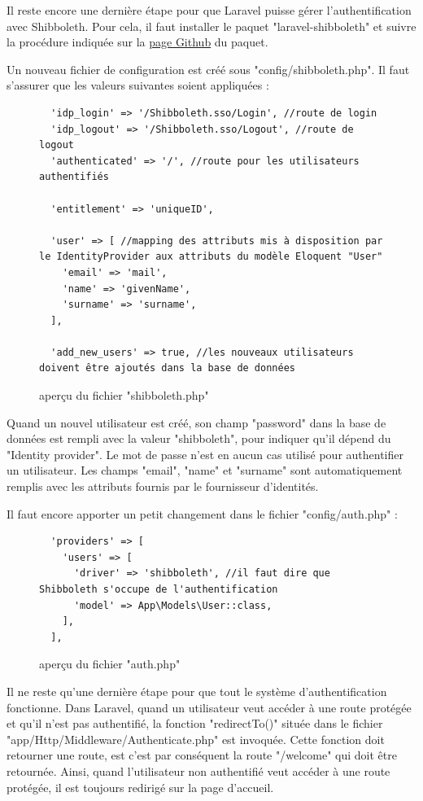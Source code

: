 \documentclass[
    iai, %
    eai, %
]{heig-tb}
\begin{document}
Il reste encore une dernière étape pour que Laravel puisse gérer l'authentification avec Shibboleth. Pour cela, il faut installer le paquet "laravel-shibboleth" et suivre la procédure indiquée sur la \href{https://github.com/uabookstores/laravel-shibboleth}{page Github} du paquet.

Un nouveau fichier de configuration est créé sous "config/shibboleth.php". Il faut s'assurer que les valeurs suivantes soient appliquées :

\begin{figure}[h]
  \begin{verbatim}
  'idp_login' => '/Shibboleth.sso/Login', //route de login
  'idp_logout' => '/Shibboleth.sso/Logout', //route de logout
  'authenticated' => '/', //route pour les utilisateurs authentifiés

  'entitlement' => 'uniqueID',

  'user' => [ //mapping des attributs mis à disposition par le IdentityProvider aux attributs du modèle Eloquent "User"
    'email' => 'mail',
    'name' => 'givenName',
    'surname' => 'surname',
  ],

  'add_new_users' => true, //les nouveaux utilisateurs doivent être ajoutés dans la base de données
  \end{verbatim}
  \caption{aperçu du fichier "shibboleth.php"}
\end{figure}

Quand un nouvel utilisateur est créé, son champ "password" dans la base de données est rempli avec la valeur "shibboleth", pour indiquer qu'il dépend du "Identity provider". Le mot de passe n'est en aucun cas utilisé pour authentifier un utilisateur. Les champs "email", "name" et "surname" sont automatiquement remplis avec les attributs fournis par le fournisseur d'identités.

\newpage
Il faut encore apporter un petit changement dans le fichier "config/auth.php" :

\begin{figure}[h]
  \begin{verbatim}
  'providers' => [
    'users' => [
      'driver' => 'shibboleth', //il faut dire que Shibboleth s'occupe de l'authentification
      'model' => App\Models\User::class,
    ],
  ],
  \end{verbatim}
  \caption{aperçu du fichier "auth.php"}
\end{figure}

Il ne reste qu'une dernière étape pour que tout le système d'authentification fonctionne. Dans Laravel, quand un utilisateur veut accéder à une route protégée et qu'il n'est pas authentifié, la fonction "redirectTo()" située dans le fichier "app/Http/Middleware/Authenticate.php" est invoquée. Cette fonction doit retourner une route, est c'est par conséquent la route "/welcome" qui doit être retournée. Ainsi, quand l'utilisateur non authentifié veut accéder à une route protégée, il est toujours redirigé sur la page d'accueil.
\end{document}
